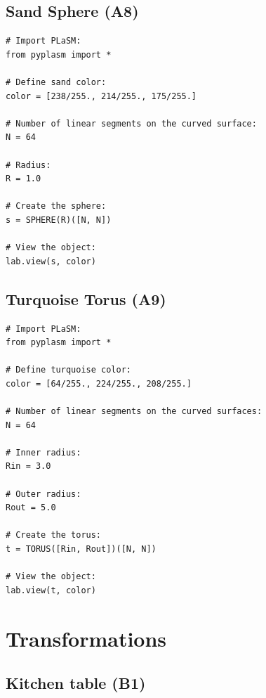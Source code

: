 \documentclass[article,A4,12pt]{llncs}
\begin{document}
\subsection{Sand Sphere (A8)}

\begin{verbatim}
# Import PLaSM:
from pyplasm import *

# Define sand color:
color = [238/255., 214/255., 175/255.]

# Number of linear segments on the curved surface:
N = 64

# Radius:
R = 1.0

# Create the sphere:
s = SPHERE(R)([N, N])

# View the object:
lab.view(s, color)
\end{verbatim}


\subsection{Turquoise Torus (A9)}

\begin{verbatim}
# Import PLaSM:
from pyplasm import *

# Define turquoise color:
color = [64/255., 224/255., 208/255.]

# Number of linear segments on the curved surfaces:
N = 64

# Inner radius:
Rin = 3.0

# Outer radius:
Rout = 5.0

# Create the torus:
t = TORUS([Rin, Rout])([N, N])

# View the object:
lab.view(t, color)
\end{verbatim}





\section{Transformations}

\subsection{Kitchen table (B1)}
\end{document}
